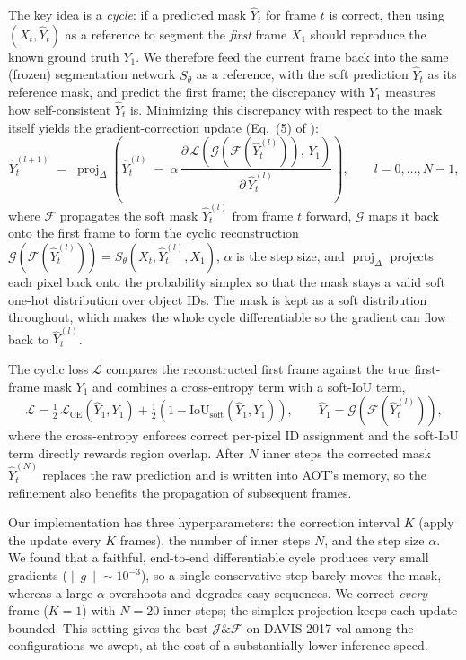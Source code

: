 \documentclass{article}
\begin{document}
The key idea is a \emph{cycle}: if a predicted mask $\hat{Y}_t$ for frame $t$ is correct, then using
$(X_t,\hat{Y}_t)$ as a reference to segment the \emph{first} frame $X_1$ should reproduce the known
ground truth $Y_1$. We therefore feed the current frame back into the same (frozen) segmentation network
$S_\theta$ as a reference, with the soft prediction $\hat{Y}_t$ as its reference mask, and predict the
first frame; the discrepancy with $Y_1$ measures how self-consistent $\hat{Y}_t$ is. Minimizing this
discrepancy with respect to the mask itself yields the gradient-correction update (Eq.~(5) of
\citet{li2020cycle}):
\[
\hat{Y}_t^{(l+1)} \;=\; \operatorname{proj}_{\Delta}\!\left(
\hat{Y}_t^{(l)} \;-\; \alpha\,
\frac{\partial\, \mathcal{L}\!\left(\mathcal{G}\!\left(\mathcal{F}(\hat{Y}_t^{(l)})\right),\, Y_1\right)}
{\partial\, \hat{Y}_t^{(l)}}
\right),
\qquad l = 0,\ldots,N-1,
\]
where $\mathcal{F}$ propagates the soft mask $\hat{Y}_t^{(l)}$ from frame $t$ forward, $\mathcal{G}$
maps it back onto the first frame to form the cyclic reconstruction
$\mathcal{G}(\mathcal{F}(\hat{Y}_t^{(l)}))=S_\theta(X_t,\hat{Y}_t^{(l)},X_1)$, $\alpha$ is the step size,
and $\operatorname{proj}_{\Delta}$ projects each pixel back onto the probability simplex so that the mask
stays a valid soft one-hot distribution over object IDs. The mask is kept as a soft distribution throughout, which makes
the whole cycle differentiable so the gradient can flow back to $\hat{Y}_t^{(l)}$.

The cyclic loss $\mathcal{L}$ compares the reconstructed first frame against the true first-frame mask
$Y_1$ and combines a cross-entropy term with a soft-IoU term,
\[
\mathcal{L} = \tfrac{1}{2}\,\mathcal{L}_{\mathrm{CE}}\!\left(\hat{Y}_1, Y_1\right)
            + \tfrac{1}{2}\left(1 - \mathrm{IoU}_{\text{soft}}\!\left(\hat{Y}_1, Y_1\right)\right),
\qquad \hat{Y}_1 = \mathcal{G}\!\left(\mathcal{F}(\hat{Y}_t^{(l)})\right),
\]
where the cross-entropy enforces correct per-pixel ID assignment and the soft-IoU term directly rewards
region overlap. After $N$ inner steps the corrected mask $\hat{Y}_t^{(N)}$ replaces the raw prediction
and is written into AOT's memory, so the refinement also benefits the propagation of subsequent frames.

Our implementation has three hyperparameters: the correction interval $K$ (apply the
update every $K$ frames), the number of inner steps $N$, and the step size $\alpha$. We found that a
faithful, end-to-end differentiable cycle produces very small gradients ($\lVert g\rVert\!\sim\!10^{-3}$),
so a single conservative step barely moves the mask, whereas a large $\alpha$ overshoots and degrades
easy sequences. We correct \emph{every} frame ($K{=}1$) with $N{=}20$ inner steps; the simplex projection keeps each update bounded. This setting gives
the best $\mathcal{J}\&\mathcal{F}$ on DAVIS-2017 val among the configurations we swept, at the cost of a substantially lower inference speed.
\end{document}
